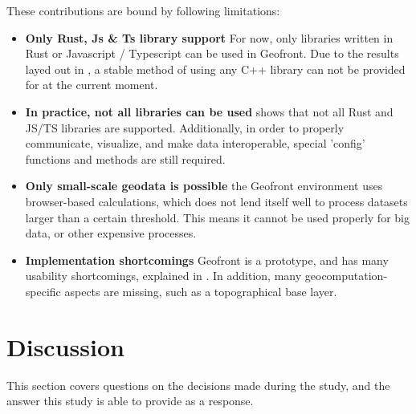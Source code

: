 These contributions are bound by following limitations:
\begin{itemize}[-]
  \item \textbf{Only Rust, Js \& Ts library support}
  For now, only libraries written in Rust or Javascript / Typescript can be used in Geofront. 
  Due to the results layed out in , a stable method of using any C++ library can not be provided for at the current moment.

  \item \textbf{In practice, not all libraries can be used }
   shows that not all Rust and JS/TS libraries are supported. 
  Additionally, in order to properly communicate, visualize, and make data interoperable, special 'config' functions and methods are still required. 
  
  \item \textbf{Only small-scale geodata is possible}
  the Geofront environment uses browser-based calculations, which does not lend itself well to process datasets larger than a certain threshold. 
  This means it cannot be used properly for big data, or other expensive processes. 

  
  
  

  \item \textbf{Implementation shortcomings} 
  Geofront is a prototype, and has many usability shortcomings, explained in .
  In addition, many geocomputation-specific aspects are missing, such as a topographical base layer.  
\end{itemize}



\section{Discussion}
\label{sec:discussion}
This section covers questions on the decisions made during the study, and the answer this study is able to provide as a response.

